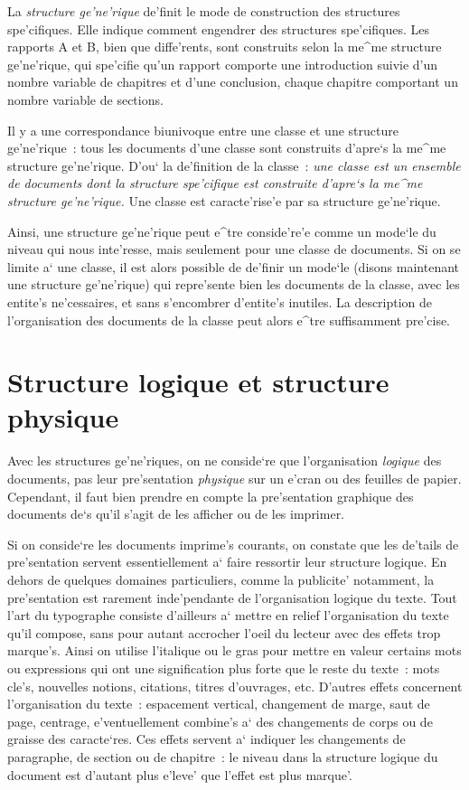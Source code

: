 La {\em structure ge'ne'rique} de'finit le mode de construction des structures
spe'cifiques. Elle indique comment engendrer des structures spe'cifiques.
Les rapports A et B, bien que diffe'rents, sont construits
selon la me^me structure ge'ne'rique, qui spe'cifie qu'un rapport comporte
une introduction suivie d'un nombre variable de chapitres et d'une
conclusion, chaque chapitre comportant un nombre variable de sections.

Il y a une correspondance biunivoque entre une classe et une structure
ge'ne'rique~: tous les documents d'une classe sont construits d'apre`s la
me^me structure ge'ne'rique. D'ou` la de'finition de la classe~:
{\it une classe est un ensemble de documents dont la structure spe'cifique
est construite d'apre`s la me^me structure ge'ne'rique.}
Une classe est caracte'rise'e par sa structure ge'ne'rique.

Ainsi, une structure ge'ne'rique peut e^tre conside're'e comme un mode`le
du niveau qui nous inte'resse, mais seulement pour une classe
de documents. Si on se limite a` une classe, il est alors possible de
de'finir un mode`le (disons maintenant une structure ge'ne'rique) qui
repre'sente bien les documents de la classe, avec les entite's ne'cessaires,
et sans s'encombrer d'entite's inutiles. La description de l'organisation
des documents de la classe peut alors e^tre suffisamment pre'cise.

\section{Structure logique et structure physique}

Avec les structures ge'ne'riques, on ne conside`re que l'organisation {\em logique}
des documents, pas leur pre'sentation {\em physique} sur un e'cran ou des feuilles
de papier. Cependant, il faut bien prendre en compte la pre'sentation
graphique des documents de`s qu'il s'agit de les afficher ou de les imprimer.

Si on conside`re les documents imprime's courants, on constate que les de'tails
de pre'sentation servent essentiellement a` faire ressortir leur structure
logique. En dehors de quelques domaines particuliers, comme la publicite'
notamment, la pre'sentation est rarement inde'pendante de l'organisation
logique du texte. Tout l'art du typographe consiste d'ailleurs a` mettre
en relief l'organisation du texte qu'il compose, sans pour autant accrocher
l'oeil du lecteur avec des effets trop marque's. Ainsi on utilise l'italique
ou le gras pour mettre en valeur certains mots ou expressions qui ont une
signification plus forte que le reste du texte~: mots cle's, nouvelles
notions, citations, titres d'ouvrages, etc. D'autres effets
concernent l'organisation du texte~: espacement vertical, changement de marge,
saut de page, centrage, e'ventuellement combine's a` des changements de corps
ou de graisse des caracte`res. Ces effets servent a` indiquer les
changements de paragraphe, de section ou de chapitre~: le niveau dans la
structure logique du document est d'autant plus e'leve' que l'effet est plus
marque'.

